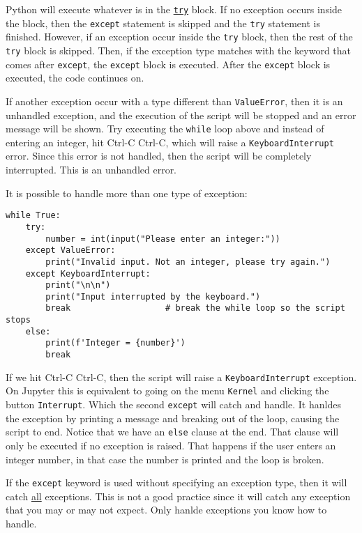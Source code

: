 \documentclass[12pt, a4paper]{article}
\begin{document}
Python will execute whatever is in the \href{https://docs.python.org/3.6/tutorial/errors.html\#handling-exceptions}{\texttt{try}} block.
If no exception occurs inside the block, then the \texttt{except} statement is skipped and the \texttt{try} statement is finished.
However, if an exception occur inside the \texttt{try} block, then the rest of the \texttt{try} block is skipped.
Then, if the exception type matches with the keyword that comes after \texttt{except}, the \texttt{except} block is executed.
After the \texttt{except} block is executed, the code continues on.

If another exception occur with a type different than \texttt{ValueError}, then it is an unhandled exception, and the execution of the script will be stopped and an error message will be shown.
Try executing the \texttt{while} loop above and instead of entering an integer, hit Ctrl-C Ctrl-C, which will raise a \texttt{KeyboardInterrupt} error.
Since this error is not handled, then the script will be completely interrupted.
This is an unhandled error.

It is possible to handle more than one type of exception:
\lstset{language=jupyter-python,label= ,caption= ,captionpos=b,numbers=none}
\begin{lstlisting}
while True:
    try:
        number = int(input("Please enter an integer:"))
    except ValueError:
        print("Invalid input. Not an integer, please try again.")
    except KeyboardInterrupt:
        print("\n\n")
        print("Input interrupted by the keyboard.")
        break                   # break the while loop so the script stops
    else:
        print(f'Integer = {number}')
        break
\end{lstlisting}

If we hit Ctrl-C Ctrl-C, then the script will raise a \texttt{KeyboardInterrupt} exception.
On Jupyter this is equivalent to going on the menu \texttt{Kernel} and clicking the button \texttt{Interrupt}.
Which the second \texttt{except} will catch and handle.
It hanldes the exception by printing a message and breaking out of the loop, causing the script to end.
Notice that we have an \texttt{else} clause at the end.
That clause will only be executed if no exception is raised.
That happens if the user enters an integer number, in that case the number is printed and the loop is broken.

If the \texttt{except} keyword is used without specifying an exception type, then it will catch \uline{all} exceptions.
This is not a good practice since it will catch any exception that you may or may not expect.
Only hanlde exceptions you know how to handle.
\end{document}

